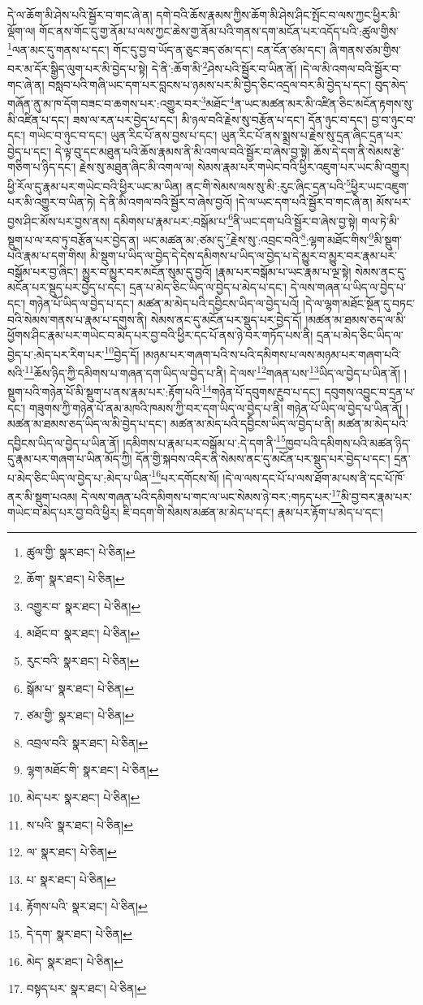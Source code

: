 དེ་ལ་ཆོག་མི་ཤེས་པའི་སྦྱོར་བ་གང་ཞེ་ན། དགེ་བའི་ཆོས་རྣམས་ཀྱིས་ཆོག་མི་ཤེས་ཤིང་སྤོང་བ་ལས་ཀྱང་ཕྱིར་མི་ལྡོག་ལ། གོང་ནས་གོང་དུ་གྱ་ནོམ་པ་ལས་ཀྱང་ཆེས་གྱ་ནོམ་པའི་གནས་དག་མངོན་པར་འདོད་པའི་:ཚུལ་གྱིས་\footnote{ཚུལ་གྱི་  སྣར་ཐང་།  པེ་ཅིན། }ལན་མང་དུ་གནས་པ་དང་། གོང་དུ་བྱ་བ་ཡོད་ན་ཅུང་ཟད་ཙམ་དང་། ངན་ངོན་ཙམ་དང་། ཞི་གནས་ཙམ་གྱིས་བར་མ་དོར་སྒྱིད་ལུག་པར་མི་བྱེད་པ་སྟེ། དེ་ནི་:ཆོག་མི་\footnote{ཆོག་  སྣར་ཐང་།  པེ་ཅིན། }ཤེས་པའི་སྦྱོར་བ་ཡིན་ནོ། །དེ་ལ་མི་འགལ་བའི་སྦྱོར་བ་གང་ཞེ་ན། བསླབ་པའི་གཞི་ཡང་དག་པར་བླངས་པ་ཉམས་པར་མི་བྱེད་ཅིང་འདྲལ་བར་མི་བྱེད་པ་དང་། བུད་མེད་གཞོན་ནུ་མ་ཁ་དོག་བཟང་བ་ཆགས་པར་:འགྱུར་བར་\footnote{འགྱུར་བ་  སྣར་ཐང་།  པེ་ཅིན། }མཐོང་\footnote{མཐོང་བ་  སྣར་ཐང་།  པེ་ཅིན། }ན་ཡང་མཚན་མར་མི་འཛིན་ཅིང་མངོན་རྟགས་སུ་མི་འཛིན་པ་དང་། ཟས་ལ་རན་པར་བྱེད་པ་དང་། མི་ཉལ་བའི་རྗེས་སུ་བརྩོན་པ་དང་། དོན་ཉུང་བ་དང་། བྱ་བ་ཉུང་བ་དང་། གཡེང་བ་ཉུང་བ་དང་། ཡུན་རིང་པོ་ནས་བྱས་པ་དང་། ཡུན་རིང་པོ་ནས་སྨྲས་པ་རྗེས་སུ་དྲན་ཞིང་དྲན་པར་བྱེད་པ་དང་། དེ་ལྟ་བུ་དང་མཐུན་པའི་ཆོས་རྣམས་ནི་མི་འགལ་བའི་སྦྱོར་བ་ཞེས་བྱ་སྟེ། ཆོས་དེ་དག་ནི་སེམས་རྩེ་གཅིག་པ་ཉིད་དང་། རྗེས་སུ་མཐུན་ཞིང་མི་འགལ་ལ། སེམས་རྣམ་པར་གཡེང་བའི་ཕྱིར་འཇུག་པར་ཡང་མི་འགྱུར། ཕྱི་རོལ་དུ་རྣམ་པར་གཡེང་བའི་ཕྱིར་ཡང་མ་ཡིན། ནང་གི་སེམས་ལས་སུ་མི་:རུང་ཞིང་དྲན་པའི་\footnote{རུང་བའི་  སྣར་ཐང་།  པེ་ཅིན། }ཕྱིར་ཡང་འཇུག་པར་མི་འགྱུར་བ་ཡིན་ཏེ། དེ་ནི་མི་འགལ་བའི་སྦྱོར་བ་ཞེས་བྱའོ། །དེ་ལ་ཡང་དག་པའི་སྦྱོར་བ་གང་ཞེ་ན། མོས་པར་བྱས་ཤིང་མོས་པར་བྱས་ནས། དམིགས་པ་རྣམ་པར་:བསྒོམ་པ་\footnote{སྒོམ་པ་  སྣར་ཐང་།  པེ་ཅིན། }ནི་ཡང་དག་པའི་སྦྱོར་བ་ཞེས་བྱ་སྟེ། གལ་ཏེ་མི་སྡུག་པ་ལ་རབ་ཏུ་བརྩོན་པར་བྱེད་ན། ཡང་མཚན་མ་:ཙམ་དུ་\footnote{ཙམ་གྱི་  སྣར་ཐང་།  པེ་ཅིན། }རྗེས་སུ་:འབྲང་བའི་\footnote{འབྲལ་བའི་  སྣར་ཐང་།  པེ་ཅིན། }:ལྷག་མཐོང་གིས་\footnote{ལྷག་མཐོང་གི་  སྣར་ཐང་།  པེ་ཅིན། }མི་སྡུག་པའི་རྣམ་པ་དག་གིས། མི་སྡུག་པ་ཡིད་ལ་བྱེད་དེ་དེས་དམིགས་པ་ཡིད་ལ་བྱེད་པ་དེ་མྱུར་བ་མྱུར་བར་རྣམ་པར་བསྒོམ་པར་བྱ་ཞིང་། མྱུར་བ་མྱུར་བར་མངོན་སུམ་དུ་བྱའོ། །རྣམ་པར་བསྒོམ་པ་ཡང་རྣམ་པ་ལྔ་སྟེ། སེམས་ནང་དུ་མངོན་པར་སྡུད་པར་བྱེད་པ་དང་། དྲན་པ་མེད་ཅིང་ཡིད་ལ་བྱེད་པ་མེད་པ་དང་། དེ་ལས་གཞན་པ་ཡིད་ལ་བྱེད་པ་དང་། གཉེན་པོ་ཡིད་ལ་བྱེད་པ་དང་། མཚན་མ་མེད་པའི་དབྱིངས་ཡིད་ལ་བྱེད་པའོ། །དེ་ལ་ལྷག་མཐོང་སྔོན་དུ་བཏང་བའི་སེམས་གནས་པ་རྣམ་པ་དགུས་ནི། སེམས་ནང་དུ་མངོན་པར་སྡུད་པར་བྱེད་དོ། །མཚན་མ་ཐམས་ཅད་ལ་མི་ཕྱོགས་ཤིང་རྣམ་པར་གཡེང་བ་མེད་པར་བྱ་བའི་ཕྱིར་དང་པོ་ནས་ཉེ་བར་གཏོད་པས་ནི། དྲན་པ་མེད་ཅིང་ཡིད་ལ་བྱེད་པ་:མེད་པར་རིག་པར་\footnote{མེད་པར་  སྣར་ཐང་།  པེ་ཅིན། }བྱེད་དོ། །མཉམ་པར་གཞག་པའི་ས་པའི་དམིགས་པ་ལས་མཉམ་པར་གཞག་པའི་སའི་\footnote{ས་པའི་  སྣར་ཐང་།  པེ་ཅིན། }ཆོས་ཉིད་ཀྱི་དམིགས་པ་གཞན་དག་ཡིད་ལ་བྱེད་པ་ནི། དེ་ལས་\footnote{ལ་  སྣར་ཐང་།  པེ་ཅིན། }གཞན་པས་\footnote{པ་  སྣར་ཐང་།  པེ་ཅིན། }ཡིད་ལ་བྱེད་པ་ཡིན་ནོ། །སྡུག་པའི་གཉེན་པོ་མི་སྡུག་པ་ནས་རྣམ་པར་:རྟོག་པའི་\footnote{རྟོགས་པའི་  སྣར་ཐང་།  པེ་ཅིན། }གཉེན་པོ་དབུགས་རྔུབ་པ་དང་། དབུགས་འབྱུང་བ་དྲན་པ་དང་། གཟུགས་ཀྱི་གཉེན་པོ་ནམ་མཁའི་ཁམས་ཀྱི་བར་དག་ཡིད་ལ་བྱེད་པ་ནི། གཉེན་པོ་ཡིད་ལ་བྱེད་པ་ཡིན་ནོ། །མཚན་མ་ཐམས་ཅད་ཡིད་ལ་མི་བྱེད་པ་དང་། མཚན་མ་མེད་པའི་དབྱིངས་ཡིད་ལ་བྱེད་པ་ནི། མཚན་མ་མེད་པའི་དབྱིངས་ཡིད་ལ་བྱེད་པ་ཡིན་ནོ། །དམིགས་པ་རྣམ་པར་བསྒོམ་པ་:དེ་དག་ནི་\footnote{དེ་དག་  སྣར་ཐང་།  པེ་ཅིན། }ཁྱབ་པའི་དམིགས་པའི་མཚན་ཉིད་དུ་རྣམ་པར་གཞག་པ་ཡིན་མོད་ཀྱི། དོན་གྱི་སྐབས་འདིར་ནི་སེམས་ནང་དུ་མངོན་པར་སྡུད་པར་བྱེད་པ་དང་། དྲན་པ་མེད་ཅིང་ཡིད་ལ་བྱེད་པ་:མེད་པ་ཡིན་\footnote{མེད་  སྣར་ཐང་།  པེ་ཅིན། }པར་དགོངས་སོ། །དེ་ལ་ལས་དང་པོ་པ་ལས་ཐོག་མ་པས་ནི་དང་པོ་ཁོ་ནར་མི་སྡུག་པའམ། དེ་ལས་གཞན་པའི་དམིགས་པ་གང་ལ་ཡང་སེམས་ཉེ་བར་:གཏད་པར་\footnote{བསྟད་པར་  སྣར་ཐང་།  པེ་ཅིན། }མི་བྱ་བར་རྣམ་པར་གཡེང་བ་མེད་པར་བྱ་བའི་ཕྱིར། ཇི་བདག་གི་སེམས་མཚན་མ་མེད་པ་དང་། རྣམ་པར་རྟོག་པ་མེད་པ་དང་། 